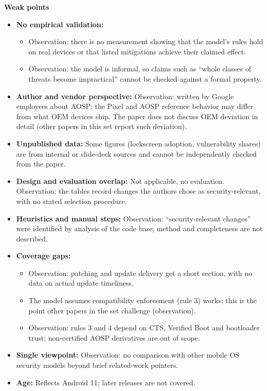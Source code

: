 \documentclass[11pt,a4paper]{article}
\begin{document}
\begin{enumerate}
    \vspace{4pt}
    \textbf{Weak points}
    \begin{itemize}[leftmargin=*,itemsep=1pt,topsep=2pt]
        \item \textbf{No empirical validation:}
        \begin{itemize}[itemsep=0pt]
            \item Observation: there is no measurement showing that the model's rules hold on real devices or that listed mitigations achieve their claimed effect.
            \item Observation: the model is informal, so claims such as ``whole classes of threats become impractical'' cannot be checked against a formal property.
        \end{itemize}
        \item \textbf{Author and vendor perspective:} Observation: written by Google employees about AOSP; the Pixel and AOSP reference behavior may differ from what OEM devices ship. The paper does not discuss OEM deviation in detail (other papers in this set report such deviation).
        \item \textbf{Unpublished data:} Some figures (lockscreen adoption, vulnerability shares) are from internal or slide-deck sources and cannot be independently checked from the paper.
        \item \textbf{Design and evaluation overlap:} Not applicable, no evaluation. Observation: the tables record changes the authors chose as security-relevant, with no stated selection procedure.
        \item \textbf{Heuristics and manual steps:} Observation: ``security-relevant changes'' were identified by analysis of the code base; method and completeness are not described.
        \item \textbf{Coverage gaps:}
        \begin{itemize}[itemsep=0pt]
            \item Observation: patching and update delivery get a short section, with no data on actual update timeliness.
            \item The model assumes compatibility enforcement (rule 3) works; this is the point other papers in the set challenge (observation).
            \item Observation: rules 3 and 4 depend on CTS, Verified Boot and bootloader trust; non-certified AOSP derivatives are out of scope.
        \end{itemize}
        \item \textbf{Single viewpoint:} Observation: no comparison with other mobile OS security models beyond brief related-work pointers.
        \item \textbf{Age:} Reflects Android 11; later releases are not covered.
    \end{itemize}


\end{enumerate}
\end{document}
